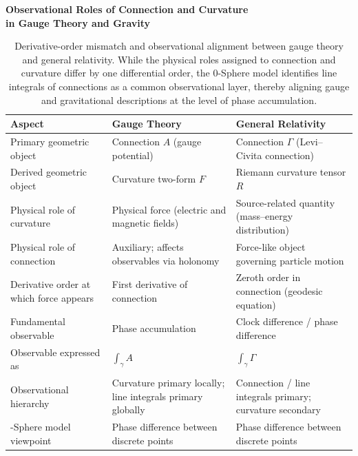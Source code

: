 \documentclass[12pt,letterpaper]{article} %
\begin{document}
\begin{table}[t!]
\centering

{\centering
\textbf{Observational Roles of Connection and Curvature\\ in Gauge Theory and Gravity}\par
\vspace{0.4em}
}

\renewcommand{\arraystretch}{1.4}
\begin{tabular}{p{5.0cm}p{5.0cm}p{4.8cm}}
\toprule
\textbf{Aspect} & \textbf{Gauge Theory} & \textbf{General Relativity} \\
\midrule
Primary geometric object
& Connection $A$ (gauge potential)
& Connection $\Gamma$ (Levi--Civita connection) \\

\addlinespace[0.25cm]
Derived geometric object
& Curvature two-form $F$
& Riemann curvature tensor $R$ \\

\addlinespace[0.25cm]
Physical role of curvature
& Physical force (electric and magnetic fields)
& Source-related quantity (mass--energy distribution) \\

\addlinespace[0.25cm]
Physical role of connection
& Auxiliary; affects observables via holonomy
& Force-like object governing particle motion \\

\addlinespace[0.25cm]
Derivative order at which force appears
& First derivative of connection
& Zeroth order in connection (geodesic equation) \\

\addlinespace[0.25cm]
Fundamental observable
& Phase accumulation
& Clock difference / phase difference \\

\addlinespace[0.25cm]
Observable expressed as
& $\displaystyle \int_\gamma A$
& $\displaystyle \int_\gamma \Gamma$ \\

\addlinespace[0.25cm]
Observational hierarchy
& Curvature primary locally; line integrals primary globally
& Connection / line integrals primary; curvature secondary \\

\addlinespace[0.25cm]
0-Sphere model viewpoint
& Phase difference between discrete points
& Phase difference between discrete points \\
\bottomrule
\end{tabular}

\caption{Derivative-order mismatch and observational alignment between gauge theory and general relativity. 
While the physical roles assigned to connection and curvature differ by one differential order, 
the 0-Sphere model identifies line integrals of connections as a common observational layer, 
thereby aligning gauge and gravitational descriptions at the level of phase accumulation.}
\label{tab:derivative-order-summary}

\end{table}
\end{document}
